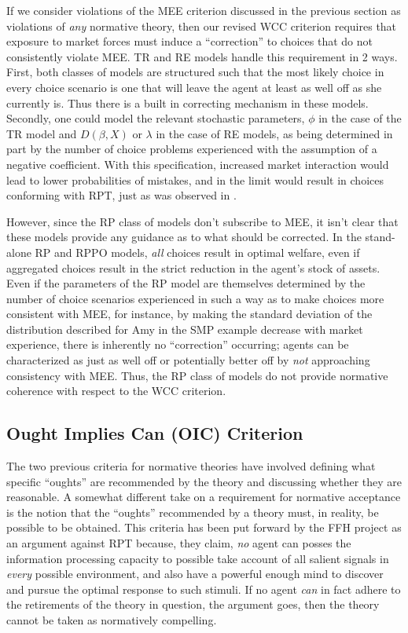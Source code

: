 \documentclass[../main.tex]{subfiles}
\begin{document}
If we consider violations of the MEE criterion discussed in the previous section as violations of \textit{any} normative theory, then our revised WCC criterion requires that exposure to market forces must induce a \enquote{correction} to choices that do not consistently violate MEE.
TR and RE models handle this requirement in 2 ways. 
First, both classes of models are structured such that the most likely choice in every choice scenario is one that will leave the agent at least as well off as she currently is.
Thus there is a built in correcting mechanism in these models.
Secondly, one could model the relevant stochastic parameters, $\phi$ in the case of the TR model and $D(\beta,X)$ or $\lambda$ in the case of RE models, as being determined in part by the number of choice problems experienced with the assumption of a negative coefficient.
With this specification, increased market interaction would lead to lower probabilities of mistakes, and in the limit would result in choices conforming with RPT, just as was observed in \textcite{Chu1990}.

However, since the RP class of models don't subscribe to MEE, it isn't clear that these models provide any guidance as to what should be corrected.
In the stand-alone RP and RPPO models, \textit{all} choices result in optimal welfare, even if aggregated choices result in the strict reduction in the agent's stock of assets.
Even if the parameters of the RP model are themselves determined by the number of choice scenarios experienced in such a way as to make choices more consistent with MEE, for instance, by making the standard deviation of the distribution described for Amy in the SMP example decrease with market experience, there is inherently no \enquote{correction} occurring;
agents can be characterized as just as well off or potentially better off by \textit{not} approaching consistency with MEE.
Thus, the RP class of models do not provide normative coherence with respect to the WCC criterion.

\subsection{Ought Implies Can (OIC) Criterion}

The two previous criteria for normative theories have involved defining what specific \enquote{oughts} are recommended by the theory and discussing whether they are reasonable.
A somewhat different take on a requirement for normative acceptance is the notion that the \enquote{oughts} recommended by a theory must, in reality, be possible to be obtained.
This criteria has been put forward by the FFH project as an argument against RPT because, they claim, \textit{no} agent can posses the information processing capacity to possible take account of all salient signals in \textit{every} possible environment, and also have a powerful enough mind to discover and pursue the optimal response to such stimuli.
If no agent \textit{can} in fact adhere to the retirements of the theory in question, the argument goes, then the theory cannot be taken as normatively compelling.
\end{document}
